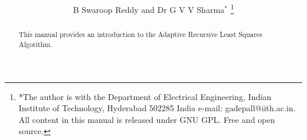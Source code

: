 \documentclass[journal,12pt,twocolumn]{IEEEtran}
\renewcommand\thesection{\arabic{section}}
\begin{document}
\makeatletter
{}
\makeatother

\let\StandardTheFigure\thefigure
\renewcommand{\thefigure}{\thesection}



\makeatletter
{}
\makeatother

\let\StandardTheFigure\thefigure
\let\StandardTheTable\thetable





\def\putbox#1#2#3{\makebox[0in][l]{\makebox[#1][l]{}\raisebox{\baselineskip}[0in][0in]{\raisebox{#2}[0in][0in]{#3}}}}
     \def\rightbox#1{\makebox[0in][r]{#1}}
     \def\centbox#1{\makebox[0in]{#1}}
     \def\topbox#1{\raisebox{-\baselineskip}[0in][0in]{#1}}
     \def\midbox#1{\raisebox{-0.5\baselineskip}[0in][0in]{#1}}

\vspace{3cm}


\title{ 
}

\author{B Swaroop Reddy and Dr G V V Sharma$^{*}$%
	\thanks{*The author is with the Department
		of Electrical Engineering, Indian Institute of Technology, Hyderabad
		502285 India e-mail:  gadepall@iith.ac.in. All content in this manual is released under GNU GPL.  Free and open source.}
	
}	

\maketitle

\tableofcontents
\bigskip

\begin{abstract}
	
	This manual provides an introduction to the Adaptive Recursive Least Squares Algorithm.
	
\end{abstract}
\end{document}
